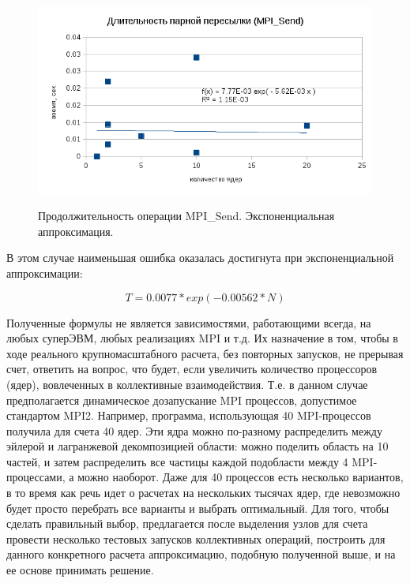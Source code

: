          
         
         \begin{figure}[htb]
         	\begin{center}
         		\includegraphics[height=7cm,keepaspectratio]{images/RomanenkoAASnytnikovAVChernykhIGadaptationtosupercomputerfinalEXTENDEDREFERENCES-img7.png}
         	\end{center}
         	\caption{Продолжительность операции MPI\_Send. Экспоненциальная аппроксимация.}
         	\label{send_exp_appr}
         \end{figure} 
         
        В этом случае наименьшая ошибка оказалась достигнута при экспоненциальной аппроксимации:
        
        $$
        T = 0.0077*exp(-0.00562*N)
        $$
        
        
        Полученные формулы не является зависимостями, работающими всегда, на любых суперЭВМ, любых реализациях MPI и т.д. Их назначение в том, чтобы в ходе реального крупномасштабного расчета, без повторных запусков, не прерывая счет, ответить на вопрос, что будет, если увеличить количество процессоров (ядер), вовлеченных в коллективные взаимодействия. Т.е. в данном случае предполагается динамическое дозапускание MPI процессов, допустимое стандартом MPI2.
        Например, программа, использующая 40 MPI-процессов  получила для счета 40 ядер. Эти ядра можно по-разному распределить между эйлерой и лагранжевой декомпозицией области: можно поделить область на 10 частей, и затем распределить все частицы каждой подобласти между  4 MPI-процессами, а можно наоборот. Даже для 40 процессов есть несколько вариантов, в то время как речь идет о расчетах на нескольких тысячах ядер, где невозможно будет просто перебрать все варианты и выбрать оптимальный.
        Для того, чтобы сделать правильный выбор, предлагается после выделения узлов для счета провести несколько тестовых запусков коллективных операций, построить для данного конкретного расчета аппроксимацию, подобную полученной выше, и на ее основе принимать решение.
        

